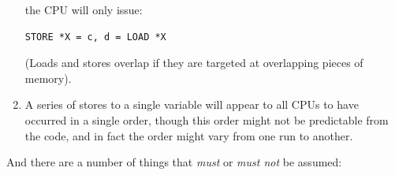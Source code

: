\begin{enumerate}
	the CPU will only issue:

\begin{minipage}[t]{\columnwidth}
\scriptsize
\begin{verbatim}
STORE *X = c, d = LOAD *X
\end{verbatim}
\end{minipage}

	(Loads and stores overlap if they are targeted at overlapping pieces of
	memory).
\item	A series of stores to a single variable will appear to all
	CPUs to have occurred in a single order, though this order
	might not be predictable from the code, and in fact the
	order might vary from one run to another.
\end{enumerate}

And there are a number of things that \emph{must} or \emph{must not} be assumed:

